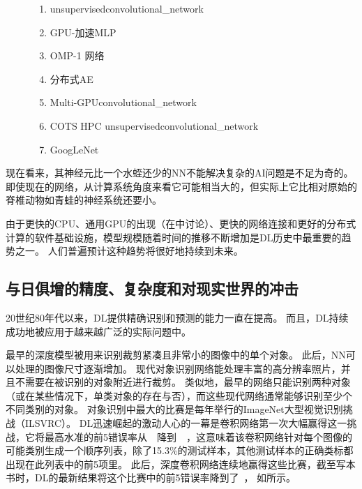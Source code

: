\begin{figure}[!htb]
{\begin{enumerate}
    GPU-加速\gls{DBN}~\citep{RainaICML09}
  \item %
    \gls{unsupervised}\gls{convolutional_network}~\citep{Jarrett-ICCV2009-small}
  \item %
    GPU-加速\gls{MLP}~\citep{Ciresan-2010}
  \item %
    OMP-1 网络~\citep{Coates2011b}
  \item %
    分布式\gls{AE}~\citep{QuocLe-ICML2012}
  \item %
    Multi-GPU\gls{convolutional_network}~\citep{Krizhevsky-2012-small}
  \item %
    COTS HPC \gls{unsupervised}\gls{convolutional_network}~\citep{icml2013_coates13}
  \item %
    GoogLeNet~\citep{Szegedy-et-al-arxiv2014}
\end{enumerate}
}
\end{figure}


现在看来，其神经元比一个水蛭还少的\gls{NN}不能解决复杂的\gls{AI}问题是不足为奇的。
即使现在的网络，从计算系统角度来看它可能相当大的，但实际上它比相对原始的脊椎动物如青蛙的神经系统还要小。

由于更快的CPU、通用GPU的出现（在中讨论）、更快的网络连接和更好的分布式计算的软件基础设施，模型规模随着时间的推移不断增加是\gls{DL}历史中最重要的趋势之一。
人们普遍预计这种趋势将很好地持续到未来。


\subsection{与日俱增的精度、复杂度和对现实世界的冲击}
\label{sec:increasing_accuracy_complexity_and_real_world_impact}

20世纪80年代以来，\gls{DL}提供精确识别和预测的能力一直在提高。
而且，\gls{DL}持续成功地被应用于越来越广泛的实际问题中。

最早的深度模型被用来识别裁剪紧凑且非常小的图像中的单个对象\citep{Rumelhart86}。
此后，\gls{NN}可以处理的图像尺寸逐渐增加。
现代对象识别网络能处理丰富的高分辨率照片，并且不需要在被识别的对象附近进行裁剪\citep{Krizhevsky-2012}。
类似地，最早的网络只能识别两种对象（或在某些情况下，单类对象的存在与否），而这些现代网络通常能够识别至少个不同类别的对象。
对象识别中最大的比赛是每年举行的ImageNet大型视觉识别挑战（ILSVRC）。
\gls{DL}迅速崛起的激动人心的一幕是卷积网络第一次大幅赢得这一挑战，它将最高水准的前5错误率从~~降到~~\citep{Krizhevsky-2012}，这意味着该卷积网络针对每个图像的可能类别生成一个顺序列表，除了15.3\%的测试样本，其他测试样本的正确类标都出现在此列表中的前5项里。
此后，深度卷积网络连续地赢得这些比赛，截至写本书时，\gls{DL}的最新结果将这个比赛中的前5错误率降到了~， 如所示。

